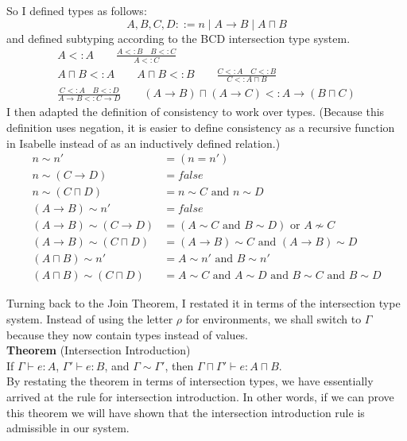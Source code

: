 \documentclass{article}
\begin{document}
So I defined types as follows:
\[
  A,B,C,D ::= n \mid A \to B \mid A \sqcap B
\]
and defined subtyping according to the BCD intersection type system.
\begin{gather*}
A <: A \qquad \frac{A <: B \quad B <: C}{A <: C} \\[2ex]
A \sqcap B <: A \qquad
A \sqcap B <: B \qquad
\frac{C <: A \quad C <: B}{C <: A \sqcap B} \\[2ex]
\frac{C <: A \quad B <: D}{A \to B <: C \to D}
\qquad
(A\to B) \sqcap (A \to C) <: A \to (B \sqcap C)
\end{gather*}
I then adapted the definition of consistency to work over types.
(Because this definition uses negation, it is easier to define
consistency as a recursive function in Isabelle instead of as an
inductively defined relation.)
\begin{align*}
 n \sim n' &= (n = n') \\
 n \sim (C \to D) &= \mathit{false} \\
 n \sim (C \sqcap D) &= n \sim C \text{ and } n \sim D \\
 (A \to B) \sim n' &= \mathit{false} \\
 (A \to B) \sim (C \to D) &= 
    (A \sim C \text{ and } B \sim D) \text{ or } A \not\sim C \\
 (A \to B) \sim (C \sqcap D) &=
    (A \to B) \sim C \text{ and } (A \to B) \sim D \\
 (A \sqcap B) \sim n' &= A \sim n' \text{ and } B \sim n' \\
 (A \sqcap B) \sim (C \sqcap D) &= 
    A \sim C \text{ and } A \sim D \text{ and } 
    B \sim C \text{ and } B \sim D
\end{align*}

Turning back to the Join Theorem, I restated it in terms of the
intersection type system. Instead of using the letter $\rho$ for
environments, we shall switch to $\Gamma$ because they now contain
types instead of values. \\

\noindent \textbf{Theorem} (Intersection Introduction)\\
  If $\Gamma \vdash e : A$, $\Gamma' \vdash e : B$, and $\Gamma \sim
  \Gamma'$, 
  then $\Gamma\sqcap\Gamma' \vdash e : A \sqcap B$. \\

By restating the theorem in terms of intersection types, we have
essentially arrived at the rule for intersection introduction.  In
other words, if we can prove this theorem we will have shown that the
intersection introduction rule is admissible in our system.
\end{document}
